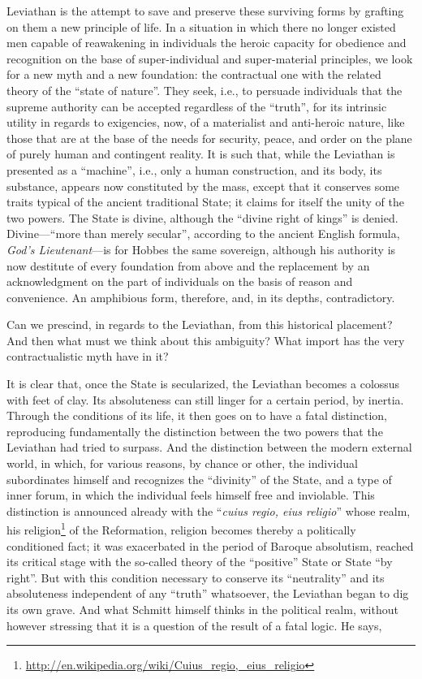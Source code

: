 Leviathan is the attempt to save and preserve these surviving forms by grafting on them a new principle of life. In a situation in which there no longer existed men capable of reawakening in individuals the heroic capacity for obedience and recognition on the base of super-individual and super-material principles, we look for a new myth and a new foundation: the contractual one with the related theory of the ``state of nature''. They seek, i.e., to persuade individuals that the supreme authority can be accepted regardless of the ``truth'', for its intrinsic utility in regards to exigencies, now, of a materialist and anti-heroic nature, like those that are at the base of the needs for security, peace, and order on the plane of purely human and contingent reality. It is such that, while the Leviathan is presented as a ``machine'', i.e., only a human construction, and its body, its substance, appears now constituted by the mass, except that it conserves some traits typical of the ancient traditional State; it claims for itself the unity of the two powers. The State is divine, although the ``divine right of kings'' is denied. Divine---``more than merely secular'', according to the ancient English formula, \emph{God's Lieutenant}---is for Hobbes the same sovereign, although his authority is now destitute of every foundation from above and the replacement by an acknowledgment on the part of individuals on the basis of reason and convenience. An amphibious form, therefore, and, in its depths, contradictory.

Can we prescind, in regards to the Leviathan, from this historical placement? And then what must we think about this ambiguity? What import has the very contractualistic myth have in it?

It is clear that, once the State is secularized, the Leviathan becomes a colossus with feet of clay. Its absoluteness can still linger for a certain period, by inertia. Through the conditions of its life, it then goes on to have a fatal distinction, reproducing fundamentally the distinction between the two powers that the Leviathan had tried to surpass. And the distinction between the modern external world, in which, for various reasons, by chance or other, the individual subordinates himself and recognizes the ``divinity'' of the State, and a type of inner forum, in which the individual feels himself free and inviolable. This distinction is announced already with the ``\emph{cuius regio, eius religio}'' whose realm, his religion\footnote{\url{http://en.wikipedia.org/wiki/Cuius\_regio,\_eius\_religio}} of the Reformation, religion becomes thereby a politically conditioned fact; it was exacerbated in the period of Baroque absolutism, reached its critical stage with the so-called theory of the ``positive'' State or State ``by right''. But with this condition necessary to conserve its ``neutrality'' and its absoluteness independent of any ``truth'' whatsoever, the Leviathan began to dig its own grave. And what Schmitt himself thinks in the political realm, without however stressing that it is a question of the result of a fatal logic. He says,


